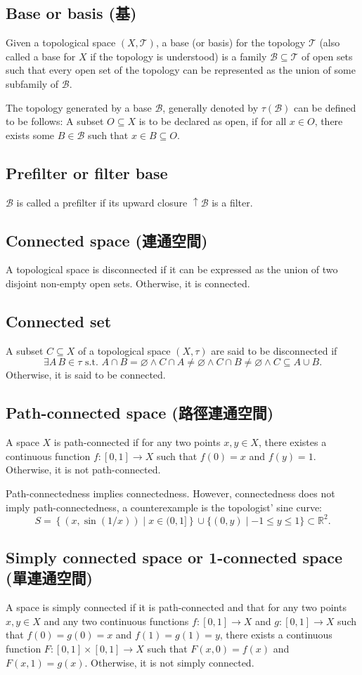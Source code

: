 \documentclass[a4paper,12pt]{article}
\begin{document}
\subsection{Base or basis (基)}
Given a topological space $(X,\mathcal{T})$, a base (or basis) for the topology $\mathcal{T}$ (also called a base for $X$ if the topology is understood) is a family $\mathcal{B}\subseteq\mathcal{T}$ of open sets such that every open set of the topology can be represented as the union of some subfamily of $\mathcal{B}$.

The topology generated by a base $\mathcal{B}$, generally denoted by $\tau(\mathcal{B})$ can be defined to be follows: A subset $O\subseteq X$ is to be declared as open, if for all $x\in O$, there exists some $B\in\mathcal{B}$ such that $x\in B\subseteq O$.
\subsection{Prefilter or filter base}
$\mathcal{B}$ is called a prefilter if its upward closure $\uparrow\mathcal{B}$ is a filter.
\subsection{Connected space (連通空間)}
A topological space is disconnected if it can be expressed as the union of two disjoint non-empty open sets. Otherwise, it is connected.
\subsection{Connected set}
A subset $C\subseteq X$ of a topological space $(X,\tau)$ are said to be disconnected if
\[\exists A\,B\in\tau\text{ s.t. }A\cap B=\varnothing\land C\cap A\neq\varnothing\land C\cap B\neq\varnothing\land C\subseteq A\cup B.\]
Otherwise, it is said to be connected.
\subsection{Path-connected space (路徑連通空間)}
A space $X$ is path-connected if for any two points $x,y\in X$, there existes a continuous function $f\colon[0,1]\to X$ such that $f(0)=x$ and $f(y)=1$. Otherwise, it is not path-connected.

Path-connectedness implies connectedness. However, connectedness does not imply path-connectedness, a counterexample is the topologist' sine curve:
\[S = \left\{ (x, \sin(1/x)) \mid x \in (0,1] \right\} \cup \{(0,y) \mid -1 \leq y \leq 1\} \subset \mathbb{R}^2.\]
\subsection{Simply connected space or 1-connected space (單連通空間)}
A space is simply connected if it is path-connected and that for any two points $x,y\in X$ and any two continuous functions $f\colon[0,1]\to X$ and $g\colon[0,1]\to X$ such that $f(0)=g(0)=x$ and $f(1)=g(1)=y$, there exists a continuous function $F\colon[0,1]\times[0,1]\to X$ such that $F(x,0)=f(x)$ and $F(x,1)=g(x)$. Otherwise, it is not simply connected.
\end{document}
